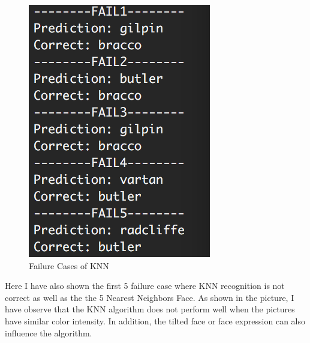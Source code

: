 \documentclass[12pt]{article} %
\begin{document}
\begin{figure}[H] %
  \centering 
  \begin{minipage}[b]{0.7\textwidth}
    \includegraphics[width=\textwidth]{part3_1}
    \caption{Failure Cases of KNN}
  \end{minipage}
\end{figure}

Here I have also shown the first 5 failure case where KNN recognition is not correct as well as the the 5 Nearest Neighbors Face. As shown in the picture, I have observe that the KNN algorithm does not perform well when the pictures have similar color intensity. In addition, the tilted face or face expression can also influence the algorithm. 
\end{document}
